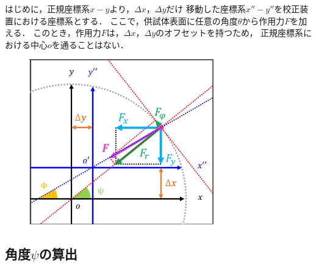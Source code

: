 \documentclass[twocolumn,a4j]{jsarticle}
\begin{document}
はじめに，正規座標系$x-y$より，$\Delta x$，$\Delta y$だけ
移動した座標系$x''-y''$を校正装置における座標系とする．
ここで，供試体表面に任意の角度$\theta$から作用力$F$を加える．
このとき，作用力$F$は，$\Delta x$，$\Delta y$のオフセットを持つため，
正規座標系における中心$o$を通ることはない．

\begin{figure}[htbp]
    \footnotesize
    \begin{center}
        \includegraphics[width=80mm]{../images/image_6.png}
        \caption{}
    \end{center}
\end{figure}




\subsection{角度$\psi$の算出}
\end{document}
